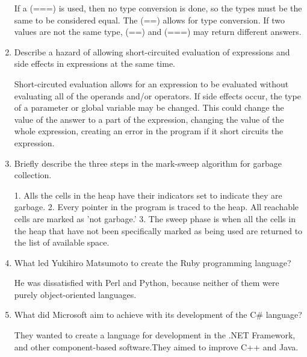 \begin{enumerate}
  \begin{answer}

    If a (===) is used, then no type conversion is done, so the types
    must be the same to be considered equal. The (==) allows for type
    conversion. If two values are not the same type, (==) and (===)
    may return different answers.

    \end{answer}

  \item Describe a hazard of allowing short-circuited evaluation
    of expressions and side effects in expressions at the same time.

  \begin{answer}

    Short-circuted evaluation allows for an expression to be evaluated
    without evaluating all of the operands and/or operators. If side
    effects occur, the type of a parameter or global variable may be
    changed. This could change the value of the answer to a part of
    the expression, changing the value of the whole expression,
    creating an error in the program if it short circuits the
    expression.

    \end{answer}

  \item Briefly describe the three steps in the mark-sweep algorithm
    for garbage collection.

  \begin{answer}

    1. Alls the cells in the heap have their indicators set to
    indicate they are garbage.  2. Every pointer in the program is
    traced to the heap. All reachable cells are marked as 'not
    garbage.'  3. The sweep phase is when all the cells in the heap
    that have not been specifically marked as being used are returned
    to the list of available space.

    \end{answer}

  \item What led Yukihiro Matsumoto to create the Ruby programming language?

  \begin{answer}

    He was dissatisfied with Perl and Python, because neither of them
    were purely object-oriented languages.

    \end{answer}

  \item What did Microsoft aim to achieve with its development of the
    C\# language?

  \begin{answer}

    They wanted to create a language for development in the .NET
    Framework, and other component-based software.They aimed to
    improve C++ and Java.

    \end{answer}

  \end{enumerate}



